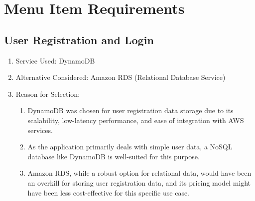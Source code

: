 
\newpage

\clearpage

\chapter{Menu Item Requirements}
\section{User Registration and Login}
\begin{enumerate}
    \item Service Used: DynamoDB
    \item  Alternative Considered: Amazon RDS (Relational Database Service)
    \item Reason for Selection: 
    \begin{enumerate}
        \item DynamoDB was chosen for user registration data storage due to its scalability, low-latency performance, and ease of integration with AWS services. 
        \item As the application primarily deals with simple user data, a NoSQL database like DynamoDB is well-suited for this purpose. 
        \item Amazon RDS, while a robust option for relational data, would have been an overkill for storing user registration data, and its pricing model might have been less cost-effective for this specific use case.
    \end{enumerate}
    
\end{enumerate}

